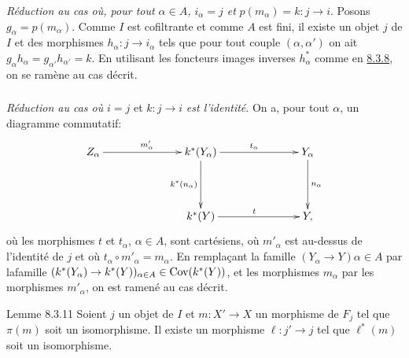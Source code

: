 \documentclass[10pt]{../fichiers-configuration-latex/smfart}
\begin{document}
\subsubsection{}

\emph{Réduction au cas où, pour tout $\alpha \in A$, $i_{\alpha} = j$ et}
  $p(m_{\alpha}) = k : j \to i$. Posons $g_{\alpha} =
  p(m_{\alpha})$. Comme $I$ est cofiltrante et comme $A$ est fini, il
  existe un objet $j$ de $I$ et des morphismes $h_{\alpha} : j \to
  i_{\alpha}$  tels que pour tout couple $(\alpha, \alpha')$ on ait
  $g_{\alpha} h_{\alpha} = g_{\alpha'} h_{\alpha'} = k$. En utilisant
  les foncteurs images inverses $h^{\ast}_{\alpha}$ comme en \hyperref[VI.subsubsec8.3.8]{8.3.8}, on
  se ramène au cas décrit.

\subsubsection{}

\emph{Réduction au cas où} $i = j$ et $k : j \to i$ \emph{est
l'identité}. On a, pour tout $\alpha$, un diagramme commutatif:
\[
\xymatrix@C=2.5cm@R=1.5cm{
Z_{\alpha}  \ar[r]^{m'_\alpha} &  k^{\ast}(Y_{\alpha}) \ar[d]_{k^{\ast}(n_{\alpha})}
\ar[r]^{t_{\alpha}} & Y_{\alpha} \ar[d]^{n_{\alpha}}\\
                    & k^{\ast}(Y)  \ar[r]^{t} & Y,
}
\]
où les morphismes $t$ et $t_{\alpha}$, $\alpha \in A$, sont
cartésiens, où $m'_{\alpha}$ est au-dessus de l'identité de $j$ et
où $t_{\alpha} \circ  m'_{\alpha} = m_{\alpha}$. En remplaçant
la famille $(Y_{\alpha} \to Y) \alpha \in A$ par la\pageoriginale famille
$(k^{\ast} (Y_{\alpha}) \to k^{\ast} (Y))_{\alpha \in A} \in
\Cov (k^{\ast} (Y))$, et les morphismes $m_{\alpha}$ par les
morphismes $m'_{\alpha}$, on est ramené au cas décrit.

\begin{enonce*}{Lemme 8.3.11}
Soient $j$ un objet de $I$ et $m : X' \to X$ un morphisme de $F_j$ tel
que $\pi(m)$ soit un isomorphisme. Il existe un morphisme $\ell : j'
\to j$ tel que $\ell^{\ast}(m)$ soit un isomorphisme.
\end{enonce*}
\end{document}
